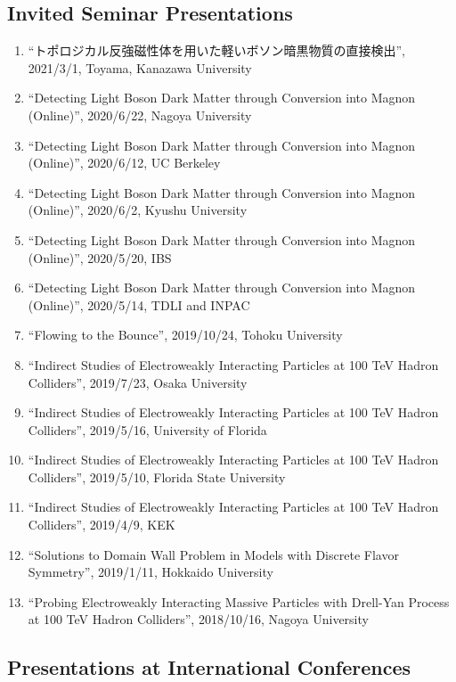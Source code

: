 \documentclass[12pt]{article}
\begin{document}
\subsection*{Invited Seminar Presentations}
\begin{enumerate}
 \item ``トポロジカル反強磁性体を用いた軽いボソン暗黒物質の直接検出'', 2021/3/1, Toyama, Kanazawa University
 \item ``Detecting Light Boson Dark Matter through Conversion into Magnon (Online)'', 2020/6/22, Nagoya University
 \item ``Detecting Light Boson Dark Matter through Conversion into Magnon (Online)'', 2020/6/12, UC Berkeley
 \item ``Detecting Light Boson Dark Matter through Conversion into Magnon (Online)'', 2020/6/2, Kyushu University
 \item ``Detecting Light Boson Dark Matter through Conversion into Magnon (Online)'', 2020/5/20, IBS
 \item ``Detecting Light Boson Dark Matter through Conversion into Magnon (Online)'', 2020/5/14, TDLI and INPAC
 \item ``Flowing to the Bounce'', 2019/10/24, Tohoku University
 \item ``Indirect Studies of Electroweakly Interacting Particles at 100 TeV Hadron Colliders'', 2019/7/23, Osaka University
 \item ``Indirect Studies of Electroweakly Interacting Particles at 100 TeV Hadron Colliders'', 2019/5/16, University of Florida
 \item ``Indirect Studies of Electroweakly Interacting Particles at 100 TeV Hadron Colliders'', 2019/5/10, Florida State University
 \item ``Indirect Studies of Electroweakly Interacting Particles at 100 TeV Hadron Colliders'', 2019/4/9, KEK
 \item ``Solutions to Domain Wall Problem in Models with Discrete Flavor Symmetry'', 2019/1/11, Hokkaido University
 \item ``Probing Electroweakly Interacting Massive Particles with Drell-Yan Process at 100 TeV Hadron Colliders'', 2018/10/16, Nagoya University
\end{enumerate}

\subsection*{Presentations at International Conferences}
\end{document}
